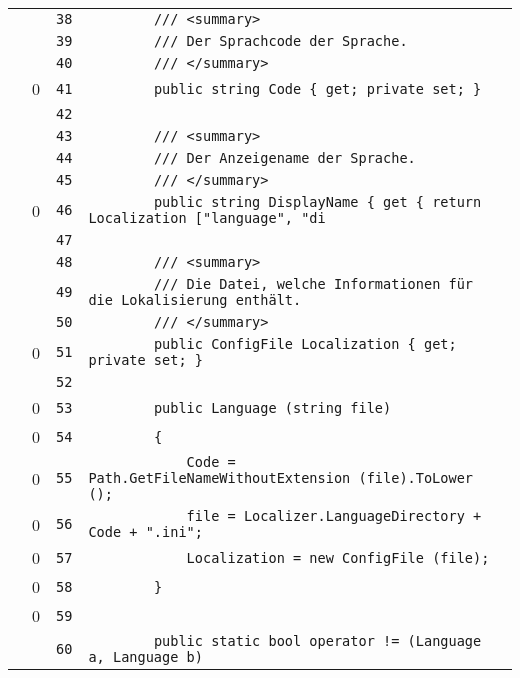 \documentclass[a4paper,10pt]{article}
\begin{document}
\begin{longtable}[l]{lrrl}
\cellcolor{gray} &  & \verb~38~ & \verb~        /// <summary>~\\
\cellcolor{gray} &  & \verb~39~ & \verb~        /// Der Sprachcode der Sprache.~\\
\cellcolor{gray} &  & \verb~40~ & \verb~        /// </summary>~\\
\cellcolor{red} & 0 & \verb~41~ & \verb~        public string Code { get; private set; }~\\
\cellcolor{gray} &  & \verb~42~ & \verb~~\\
\cellcolor{gray} &  & \verb~43~ & \verb~        /// <summary>~\\
\cellcolor{gray} &  & \verb~44~ & \verb~        /// Der Anzeigename der Sprache.~\\
\cellcolor{gray} &  & \verb~45~ & \verb~        /// </summary>~\\
\cellcolor{red} & 0 & \verb~46~ & \verb~        public string DisplayName { get { return Localization ["language", "di~\\
\cellcolor{gray} &  & \verb~47~ & \verb~~\\
\cellcolor{gray} &  & \verb~48~ & \verb~        /// <summary>~\\
\cellcolor{gray} &  & \verb~49~ & \verb~        /// Die Datei, welche Informationen für die Lokalisierung enthält.~\\
\cellcolor{gray} &  & \verb~50~ & \verb~        /// </summary>~\\
\cellcolor{red} & 0 & \verb~51~ & \verb~        public ConfigFile Localization { get; private set; }~\\
\cellcolor{gray} &  & \verb~52~ & \verb~~\\
\cellcolor{red} & 0 & \verb~53~ & \verb~        public Language (string file)~\\
\cellcolor{red} & 0 & \verb~54~ & \verb~        {~\\
\cellcolor{red} & 0 & \verb~55~ & \verb~            Code = Path.GetFileNameWithoutExtension (file).ToLower ();~\\
\cellcolor{red} & 0 & \verb~56~ & \verb~            file = Localizer.LanguageDirectory + Code + ".ini";~\\
\cellcolor{red} & 0 & \verb~57~ & \verb~            Localization = new ConfigFile (file);~\\
\cellcolor{red} & 0 & \verb~58~ & \verb~        }~\\
\cellcolor{red} & 0 & \verb~59~ & \verb~~\\
\cellcolor{gray} &  & \verb~60~ & \verb~        public static bool operator != (Language a, Language b)~\\

\end{longtable}
\end{document}
